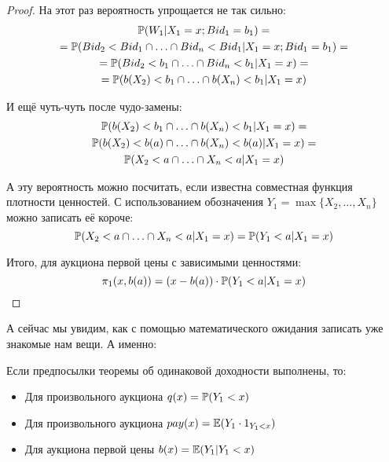 \begin{proof}
На этот раз вероятность упрощается не так сильно:
\begin{multline}
\P(W_{1}|X_{1}=x ; Bid_{1}=b_{1})=\\
=\P(Bid_{2}<Bid_{1}\cap \ldots \cap Bid_{n}<Bid_{1}|X_{1}=x ; Bid_{1}=b_{1})=\\
=\P(Bid_{2}<b_{1}\cap \ldots \cap Bid_{n}<b_{1}|X_{1}=x)=\\
=\P(b(X_{2})<b_{1}\cap \ldots \cap b(X_{n})<b_{1}|X_{1}=x)
\end{multline}

И ещё чуть-чуть после чудо-замены:
\begin{multline}
\P(b(X_{2})<b_{1}\cap \ldots \cap b(X_{n})<b_{1}|X_{1}=x)=\\
\P(b(X_{2})<b(a)\cap \ldots \cap b(X_{n})<b(a)|X_{1}=x)=\\
\P(X_{2}<a\cap \ldots \cap X_{n}<a|X_{1}=x)
\end{multline}

А эту вероятность можно посчитать, если известна совместная функция плотности ценностей. С использованием обозначения $ Y_{1}=\max\{X_{2},\ldots, X_{n}\} $ можно записать её короче:
\begin{equation}
\P(X_{2}<a\cap \ldots \cap X_{n}<a|X_{1}=x)=\P(Y_{1}<a|X_{1}=x)
\end{equation}

Итого, для аукциона первой цены с зависимыми ценностями:
\begin{equation}
\pi_{1}(x,b(a))=(x-b(a))\cdot \P(Y_{1}<a|X_{1}=x)
\end{equation}
\end{proof}

А сейчас мы увидим, как с помощью математического ожидания записать уже знакомые нам вещи. А именно:

\begin{myth} Если предпосылки теоремы об одинаковой доходности выполнены, то:
\label{probabilistic_interpretation}
\begin{itemize}
\item Для произвольного аукциона $ q(x)=\P(Y_{1}<x) $
\item Для произвольного аукциона $ pay(x)=\E(Y_{1}\cdot 1_{Y_{1}<x}) $
\item Для аукциона первой цены $ b(x)=\E(Y_{1}|Y_{1}<x) $
\end{itemize}
\end{myth}

